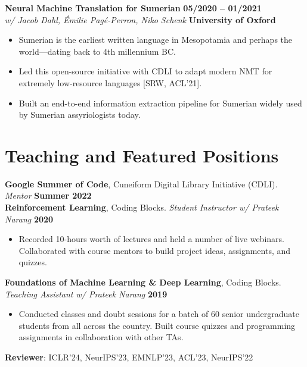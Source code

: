 \documentclass[10pt,letterpaper]{article}
\begin{document}
\vspace{3pt}

\textbf{Neural Machine Translation for Sumerian} \hfill \textbf{05/2020 -- 01/2021} \\
\textit{w/ Jacob Dahl, \'Emilie Pag\'e-Perron, Niko Schenk} \hfill \textcolor{accent}{\textbf{University of Oxford}}
\begin{itemize}
    \item Sumerian is the earliest written language in Mesopotamia and perhaps the world---dating back to 4th millennium BC.
    \item Led this open-source initiative with CDLI to adapt modern NMT for extremely low-resource languages [SRW, ACL'21].
    \item Built an end-to-end information extraction pipeline for Sumerian widely used by Sumerian assyriologists today.
\end{itemize}

\section*{Teaching and Featured Positions}
\textbf{Google Summer of Code}, Cuneiform Digital Library Initiative (CDLI). \textit{Mentor} \hfill \textbf{Summer 2022} \\
\textbf{Reinforcement Learning}, Coding Blocks. \textit{Student Instructor w/ Prateek Narang} \hfill \textbf{2020}
\begin{itemize}
    \item Recorded 10-hours worth of lectures and held a number of live webinars. Collaborated with course mentors to build project ideas, assignments, and quizzes.
\end{itemize}
\textbf{Foundations of Machine Learning \& Deep Learning}, Coding Blocks. \textit{Teaching Assistant w/ Prateek Narang} \hfill \textbf{2019}
\begin{itemize}
    \item Conducted classes and doubt sessions for a batch of 60 senior undergraduate students from all across the country. Built course quizzes and programming assignments in collaboration with other TAs.
\end{itemize}
\textbf{Reviewer}: ICLR'24, NeurIPS'23, EMNLP'23, ACL'23, NeurIPS'22
\end{document}

